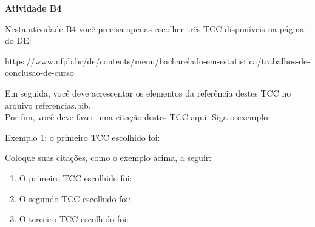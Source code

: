 \documentclass[12pt]{article}
\begin{document}
\begin{center}
\textbf{Atividade B4}
\end{center}
Nesta atividade B4 você precisa apenas escolher três TCC disponíveis na página do DE:
\begin{center}
https://www.ufpb.br/de/contents/menu/bacharelado-em-estatistica/trabalhos-de-conclusao-de-curso
\end{center}
Em seguida, você deve acrescentar os elementos da referência destes TCC no arquivo referencias.bib.\\
Por fim, você deve fazer uma citação destes TCC aqui. Siga o exemplo:\\
\par Exemplo 1: o primeiro TCC escolhido foi: \\
\par Coloque suas citações, como o exemplo acima, a seguir:\\
\begin{enumerate}
\item O primeiro TCC escolhido foi: \\
\item O segundo TCC escolhido foi: \\
\item O terceiro TCC escolhido foi: \\
\end{enumerate}



\end{document}
